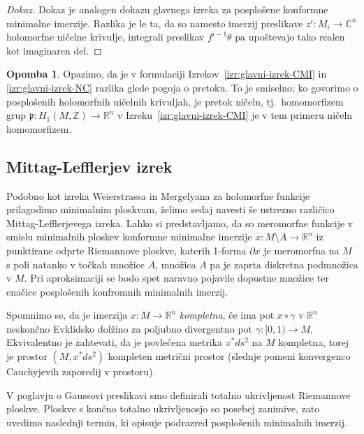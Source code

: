 \documentclass[12pt,a4paper,twoside]{article}
\theoremstyle{definition} %
\newtheorem{opomba}[definicija]{Opomba}
\newenvironment{dokaz}[1][Dokaz]{\begin{proof}[#1]}{\end{proof}}
\theoremstyle{plain} %
\numberwithin{equation}{section}  %
\newcommand{\R}{\mathbb R}
\begin{document}
\begin{dokaz}
Dokaz je analogen dokazu glavnega izreka za posplošene konformne minimalne imerzije. Razlika je le ta, da so namesto imerzij preslikave $z^{i} \colon M_{i} \to \mathbb{C}^{n}$ holomorfne ničelne krivulje, integrali preslikav $f^{i-1} \theta$ pa upoštevajo tako realen kot imaginaren del. 
\end{dokaz}

\begin{opomba}
Opazimo, da je v formulaciji Izrekov~\ref{izr:glavni-izrek-CMI} in \ref{izr:glavni-izrek-NC} razlika glede pogoja o pretoku. To je smiselno; ko govorimo o posplošenih holomorfnih ničelnih krivuljah, je pretok ničeln, tj.~homomorfizem grup $\mathfrak{p} \colon H_{1}(M, \mathbb{Z}) \to \mathbb{R}^{n}$ v Izreku~\ref{izr:glavni-izrek-CMI} je v tem primeru ničeln homomorfizem.
\end{opomba}

\subsection{Mittag-Lefflerjev izrek}
%
Podobno kot izreka Weierstrassa in Mergelyana za holomorfne funkcije prilagodimo minimalnim ploskvam, želimo sedaj navesti še ustrezno različico Mittag-Lefflerjevega izreka. Lahko si predstavljamo, da so meromorfne funkcije v smislu minimalnih ploskev konformne minimalne imerzije $x \colon M \setminus A \to \R^{n}$ iz punktirane odprte Riemannove ploskve, katerih 1-forma $\partial x$ je meromorfna na $M$ s poli natanko v točkah množice $A$, množica $A$ pa je zaprta diskretna podmnožica v $M$.
Pri aproksimaciji se bodo spet naravno pojavile dopustne množice ter enačice posplošenih konfromnih minimalnih imerzij.

Spomnimo se, da je imerzija $x \colon M \to \R^{n}$ \emph{kompletna}, če ima pot $x \circ \gamma$ v $\R^{n}$ neskončno Evklidsko dolžino za poljubno divergentno pot $\gamma \colon [0,1) \to M$.
Ekvivalentno je zahtevati, da je povlečena metrika $x^{*}ds^2$ na $M$ kompletna, torej je prostor $(M, x^{*}ds^2)$ kompleten metrični prostor (slednje pomeni konvergenco Cauchyjevih zaporedij v prostoru).

V poglavju o Gaussovi preslikavi smo definirali totalno ukrivljenost Riemannove ploskve. Ploskve s končno totalno ukrivljenosjo so posebej zanimive, zato uvedimo naslednji termin, ki opisuje podrazred posplošenih minimalnih imerzij.
\end{document}

